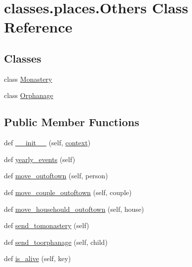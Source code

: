 \hypertarget{classclasses_1_1places_1_1Others}{}\section{classes.\+places.\+Others Class Reference}
\label{classclasses_1_1places_1_1Others}
\subsection*{Classes}
\begin{DoxyCompactItemize}
\item 
class \hyperlink{classclasses_1_1places_1_1Others_1_1Monastery}{Monastery}
\item 
class \hyperlink{classclasses_1_1places_1_1Others_1_1Orphanage}{Orphanage}
\end{DoxyCompactItemize}
\subsection*{Public Member Functions}
\begin{DoxyCompactItemize}
\item 
def \hyperlink{classclasses_1_1places_1_1Others_a8422b554ed44cb4c62e580d11e6a546d}{\+\_\+\+\_\+init\+\_\+\+\_\+} (self, \hyperlink{classclasses_1_1places_1_1Others_a85fdc7de037a236d8f0456ff63b300fc}{context})
\item 
def \hyperlink{classclasses_1_1places_1_1Others_ad6fe92b286d1b5964a3265f6e719dd4d}{yearly\+\_\+events} (self)
\item 
def \hyperlink{classclasses_1_1places_1_1Others_a28341e45d2b0ec570bd4243de8d087de}{move\+\_\+outoftown} (self, person)
\item 
def \hyperlink{classclasses_1_1places_1_1Others_a6c682ad014cbc8b17374b3765d3b38e7}{move\+\_\+couple\+\_\+outoftown} (self, couple)
\item 
def \hyperlink{classclasses_1_1places_1_1Others_aa07e4c4225b5c9c14ff98504bc0bb2d6}{move\+\_\+househould\+\_\+outoftown} (self, house)
\item 
def \hyperlink{classclasses_1_1places_1_1Others_a037c7ff4289095051ffa907eee21d887}{send\+\_\+tomonastery} (self)
\item 
def \hyperlink{classclasses_1_1places_1_1Others_ad470a665c540f9e36ad38c59e5850b02}{send\+\_\+toorphanage} (self, child)
\item 
def \hyperlink{classclasses_1_1places_1_1Others_ac64c4a57f33b00d6c4a1e7ebe4a53a82}{is\+\_\+alive} (self, key)
\end{DoxyCompactItemize}
